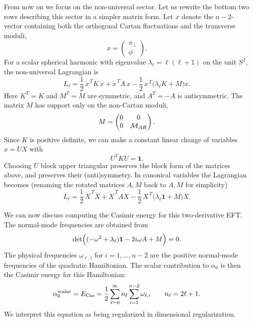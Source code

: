 \documentclass[a4paper,11pt]{article}
\begin{document}
From now on we focus on the non-universal sector. Let us rewrite the bottom two rows describing this sector in a simpler matrix form. Let $x$ denote the $n-2$-vector containing both the orthogonal Cartan fluctuations
and the transverse moduli,
\begin{equation}
    x=
    \begin{pmatrix}
    \pi_\perp\\
    \phi
    \end{pmatrix}.
\end{equation}
For a scalar spherical harmonic with eigenvalue $\lambda_\ell=\ell(\ell+1)$ on the unit $S^2$, the non-universal Lagrangian is
\begin{equation}\label{eq:transverse-lagrangian-KAM}
  L_\ell = \frac12\,\dot x^{\,T}K\,\dot x +\dot x^{\,T}A\,x -\frac12\,x^{\,T}\bigl(\lambda_\ell K+M\bigr)x .
\end{equation}
Here $K^T=K$ and $M^T=M$ are symmetric, and $A^T=-A$ is antisymmetric. The matrix $M$ has support only on the non-Cartan moduli,
\begin{equation}
M=
\begin{pmatrix}
0&0\\
0&{\cal M}_{AB}
\end{pmatrix}.
\end{equation}
Since $K$ is positive definite, we can make a constant linear change of variables $x=UX$ with
\begin{equation}
  U^T K U=\mathbf 1 .
\end{equation}
Choosing $U$ block upper triangular preserves the block form of the matrices above, and preserves their (anti)symmetry. In canonical variables the Lagrangian becomes (renaming the rotated matrices $A,M$ back to $A,M$ for simplicity)
\begin{equation}\label{eq:canonical-transverse-lagrangian}
  L_\ell = \frac12\,\dot X^{\,T}\dot X +\dot X^{\,T}AX -\frac12\,X^{\,T}\bigl(\lambda_\ell \mathbf 1 + M\bigr)X.
\end{equation}

We can now discuss computing the Casimir energy for this two-derivative EFT. The normal-mode frequencies are obtained from
\begin{equation}\label{eq:general-spectrum-determinant}
  \det\Bigl((-\omega^{2}+\lambda_\ell)\mathbf 1-2i\omega A+M\Bigr)=0.
\end{equation}
The physical frequencies $\omega_{\ell,i}$ for $i=1,\ldots,n-2$ are the positive normal-mode frequencies of the quadratic Hamiltonian. The scalar contribution to $\alpha_0$ is then the Casimir energy for this Hamiltonian:
\begin{equation}
    \alpha_0^{\rm scalar}=E_{\rm Cas}
    =
    \frac12
    \sum_{\ell=0}^{\infty}
    n_\ell
    \sum_{i=1}^{n-2}
    \omega_{\ell,i}
    \qquad
    n_\ell=2\ell+1 .
    \label{eq:scalar-casimir-general}
\end{equation}
We interpret this equation as being regularized in dimensional regularization.
\end{document}
